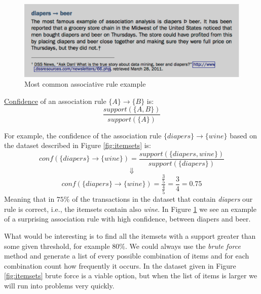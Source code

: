 \documentclass[a4paper]{article}
\begin{document}
\begin{figure}
\centering
\includegraphics[width=1.0\textwidth]{DiapersBeers.png}
\caption{\label{fig:diapersBeer} Most common associative rule example}
\end{figure}

\begin{definition}
\underline{Confidence} of an association rule $\{A\}\rightarrow\{B\}$ is:
$$\frac{support(\{A, B\})}{support(\{A\})}$$
\end{definition}

For example, the confidence of the association rule $\{diapers\}\rightarrow\{wine\}$ based on the dataset described in Figure \ref{fig:itemsets} is:
$$conf(\{diapers\}\rightarrow\{wine\})=\frac{support(\{diapers, wine\})}{support(\{diapers\})}$$
$$\Downarrow$$
$$conf(\{diapers\}\rightarrow\{wine\})=\frac{\frac{3}{5}}{\frac{4}{5}}=\frac{3}{4}=0.75$$
Meaning that in $75\%$ of the transactions in the dataset that contain \textit{diapers} our rule is correct, i.e., the itemsets contain also \textit{wine}.  In Figure \ref{fig:diapersBeer} we see an example of a surprising association rule with high confidence, between diapers and beer.

What would be interesting is to find all the itemsets with a support greater than some given threshold, for example $80\%$. We could always use the \textit{brute force} method and generate a list of every possible combination of items and for each combination count how frequently it occurs. In the dataset given in Figure \ref{fig:itemsets} brute force is a viable option, but when the list of items is larger we will run into problems very quickly.
\end{document}
